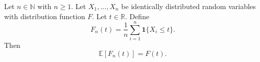 \begin{theorem}
Let $n \in \mathbb{N}$ with $n \ge 1$. Let $X_1,\ldots,X_n$ be identically
distributed random variables with distribution function $F$. Let $t \in \mathbb{R}$.
Define
\[
F_n(t)=\frac{1}{n}\sum_{i=1}^n \mathbf{1}\{X_i \le t\}.
\]
Then
\[
\mathbb{E}[F_n(t)]=F(t).
\]
\end{theorem}
